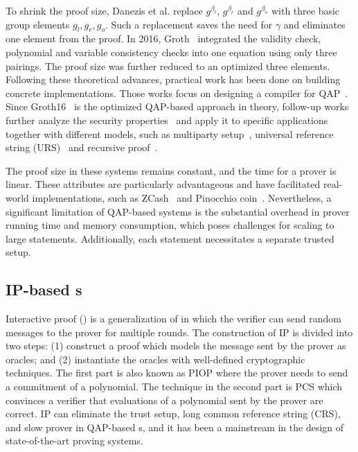 \documentclass[letterpaper,twocolumn,10pt]{article}
\theoremstyle{definition}
\newcommand{\zk}{\text{zk-SNARK}\xspace}
\newcommand{\new}[1]{{#1}\xspace}
\begin{document}
\new{To shrink the proof size, Danezis et al. \cite{danezis2013pinocchio} replace $g^{\beta_{l}}$, $g^{\beta_{r}}$ and $g^{\beta_{o}}$ with three basic group elements $g_{l},g_{r},g_{o}$. Such a replacement saves the need for $\gamma$ and eliminates one element from the proof. In 2016, Groth~\cite{groth2016size} integrated the validity check, polynomial and variable consistency checks into one equation using only three pairings. The proof size was further reduced to an optimized three elements.} Following these theoretical advances, practical work has been done on building concrete implementations. Those works focus on designing a compiler for QAP~\cite{danezis2013pinocchio,ben2013snarks,ben2014succinct}. Since Groth16~\cite{groth2016size} is the optimized QAP-based approach in theory, follow-up works further analyze the security properties~\cite{lipmaa2022unified} and apply it to specific applications together with different models, such as multiparty setup~\cite{bowe2017scalable}, universal reference string (URS)~\cite{groth2018updatable} and recursive proof~\cite{ben2017scalable}. 

The proof size in these systems remains constant, and the time for a prover is linear. These attributes are particularly advantageous and have facilitated real-world implementations, such as ZCash~\cite{sasson2014zerocash} and Pinocchio coin~\cite{danezis2013pinocchio}. Nevertheless, a significant limitation of QAP-based systems is the substantial overhead in prover running time and memory consumption, which poses challenges for scaling to large statements. Additionally, each statement necessitates a separate trusted setup.

\subsection{IP-based {\zk}s}
Interactive proof () is a generalization of  in which the verifier can send random messages to the prover for multiple rounds.
The construction of IP is divided into two steps: (1) construct a proof which models the message sent by the prover as oracles; and (2) instantiate the oracles with well-defined cryptographic techniques. The first part is also known as PIOP where the prover needs to send a commitment of a polynomial. The technique in the second part is PCS which convinces a verifier that evaluations of a polynomial sent by the prover are correct.
IP can eliminate the trust setup, long common reference string (CRS), and slow prover in QAP-based {\zk}s, and it has been a mainstream in the design of state-of-the-art proving systems.
\end{document}
